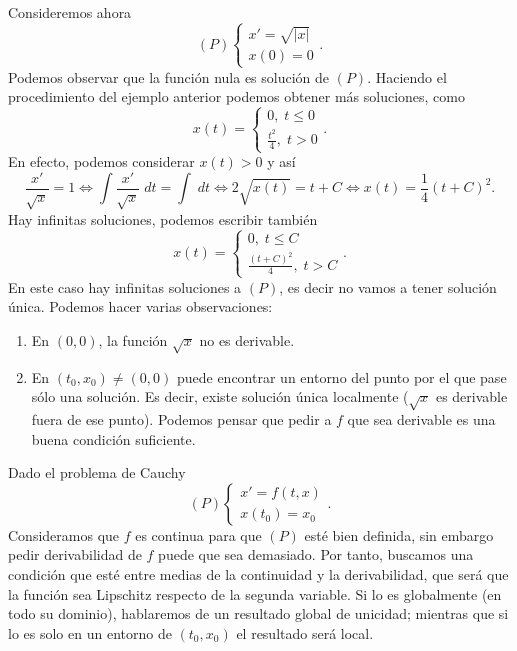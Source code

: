 \begin{eg}
Consideremos ahora
\[ \left(P\right) 
\begin{cases}
x' = \sqrt{ \left|x\right|} \\
x\left(0\right) = 0
\end{cases}
.\]
Podemos observar que la función nula es solución de $\displaystyle \left(P\right) $. Haciendo el procedimiento del ejemplo anterior podemos obtener más soluciones, como 
\[x\left(t\right) = 
\begin{cases}
0, \; t \leq 0 \\
\frac{t^{2}}{4}, \; t > 0
\end{cases}
.\]
En efecto, podemos considerar $\displaystyle x\left(t\right) > 0 $ y así
\[ \frac{x'}{\sqrt{x}} = 1 \iff \int \frac{x'}{\sqrt{x}} \; dt = \int  \; dt \iff 2\sqrt{x\left(t\right)}=t + C \iff x\left(t\right) = \frac{1}{4}\left(t+C\right)^{2} .\]
Hay infinitas soluciones, podemos escribir también 
\[x\left(t\right)=
\begin{cases}
0, \; t \leq C \\
\frac{\left(t+C\right)^{2}}{4}, \; t > C
\end{cases}
.\]
En este caso hay infinitas soluciones a $\displaystyle \left(P\right) $, es decir no vamos a tener solución única. Podemos hacer varias observaciones:
\begin{enumerate}
\item En $\displaystyle \left(0,0\right) $, la función $\displaystyle \sqrt{x} $ no es derivable.
\item En $\displaystyle \left(t_{0}, x_{0}\right)\neq \left(0,0\right) $ puede encontrar un entorno del punto por el que pase sólo una solución. Es decir, existe solución única localmente ($\displaystyle \sqrt{x} $ es derivable fuera de ese punto). Podemos pensar que pedir a $\displaystyle f $ que sea derivable es una buena condición suficiente. 
\end{enumerate}
\end{eg}
\begin{observation}
Dado el problema de Cauchy
\[ \left(P\right)
\begin{cases}
x' = f\left(t, x\right) \\
x\left(t_{0}\right) = x_{0}
\end{cases}
.\]
Consideramos que $\displaystyle f $ es continua para que $\displaystyle \left(P\right) $ esté bien definida, sin embargo pedir derivabilidad de $\displaystyle f $ puede que sea demasiado. Por tanto, buscamos una condición que esté entre medias de la continuidad y la derivabilidad, que será que la función sea Lipschitz respecto de la segunda variable. Si lo es globalmente (en todo su dominio), hablaremos de un resultado global de unicidad; mientras que si lo es solo en un entorno de $\displaystyle \left(t_{0}, x_{0}\right) $ el resultado será local. 
\end{observation}
